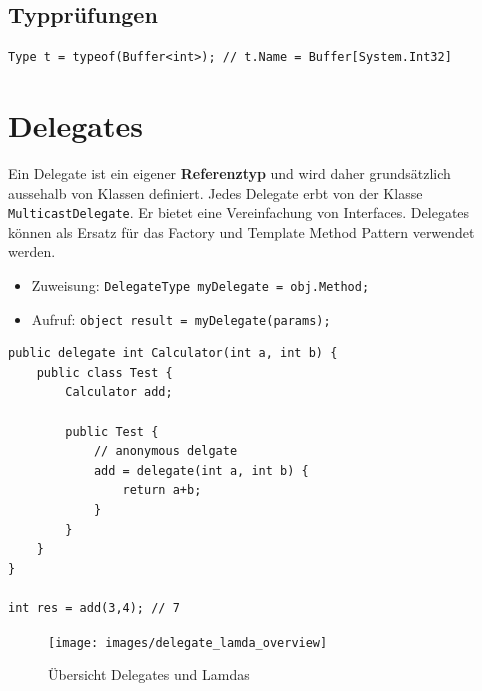 \subsection{Typprüfungen}
\begin{lstlisting}
Type t = typeof(Buffer<int>); // t.Name = Buffer[System.Int32]
\end{lstlisting}


\section{Delegates}
Ein Delegate ist ein eigener \textbf{Referenztyp} und wird daher grundsätzlich aussehalb von Klassen definiert. Jedes Delegate erbt von der Klasse \lstinline|MulticastDelegate|. Er bietet eine Vereinfachung von Interfaces. Delegates können als Ersatz für das Factory und Template Method Pattern verwendet werden. 
\begin{itemize}
	\item Zuweisung: \lstinline|DelegateType myDelegate = obj.Method;|
	\item Aufruf: \lstinline|object result = myDelegate(params);|
\end{itemize}
\begin{lstlisting}
public delegate int Calculator(int a, int b) {
	public class Test {
		Calculator add;
		
		public Test {
			// anonymous delgate
			add = delegate(int a, int b) {
				return a+b;
			}
		}
	}
}

int res = add(3,4); // 7
\end{lstlisting}

\begin{figure}[h]
	\centering
	\texttt{[image: images/delegate\_lamda\_overview]}
	\caption{Übersicht Delegates und Lamdas}
	\label{fig:delegatelamdaoverview}
\end{figure}

\clearpage

